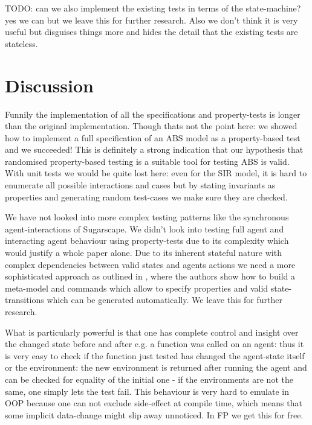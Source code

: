 TODO: can we also implement the existing tests in terms of the state-machine? yes we can but we leave this for further research. Also we don't think it is very useful but disguises things more and hides the detail that the existing tests are stateless.

\section{Discussion}
Funnily the implementation of all the specifications and property-tests is longer than the original implementation. Though thats not the point here: we showed how to implement a full specification of an ABS model as a property-based test and we succeeded! This is definitely a strong indication that our hypothesis that randomised property-based testing is a suitable tool for testing ABS is valid. With unit tests we would be quite lost here: even for the SIR model, it is hard to enumerate all possible interactions and cases but by stating invariants as properties and generating random test-cases we make sure they are checked.

We have not looked into more complex testing patterns like the synchronous agent-interactions of Sugarscape. We didn't look into testing full agent and interacting agent behaviour using property-tests due to its complexity which would justify a whole paper alone. Due to its inherent stateful nature with complex dependencies between valid states and agents actions we need a more sophisticated approach as outlined in \cite{de_vries_-depth_2019}, where the authors show how to build a meta-model and commands which allow to specify properties and valid state-transitions which can be generated automatically. We leave this for further research.

What is particularly powerful is that one has complete control and insight over the changed state before and after e.g. a function was called on an agent: thus it is very easy to check if the function just tested has changed the agent-state itself or the environment: the new environment is returned after running the agent and can be checked for equality of the initial one - if the environments are not the same, one simply lets the test fail. This behaviour is very hard to emulate in OOP because one can not exclude side-effect at compile time, which means that some implicit data-change might slip away unnoticed. In FP we get this for free.